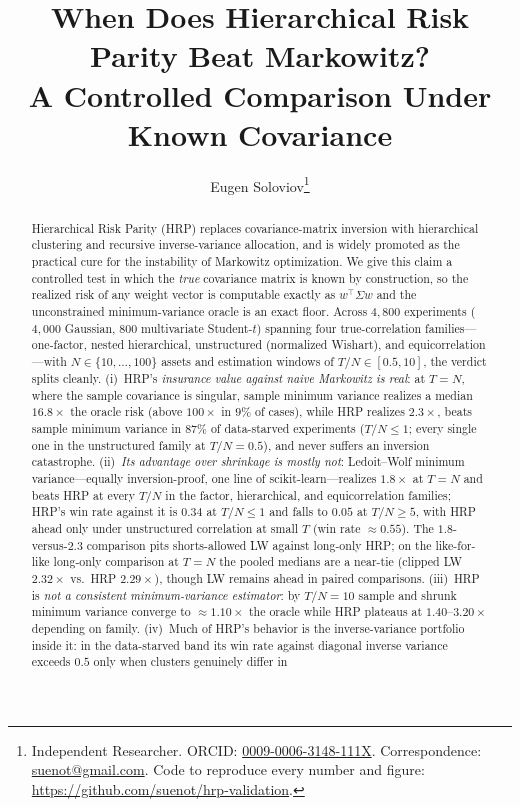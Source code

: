 \documentclass[11pt]{article}
\title{\bfseries When Does Hierarchical Risk Parity Beat Markowitz?\\
A Controlled Comparison Under Known Covariance}
\author{Eugen Soloviov\thanks{Independent Researcher. ORCID:
\href{https://orcid.org/0009-0006-3148-111X}{0009-0006-3148-111X}.
Correspondence: \href{mailto:suenot@gmail.com}{suenot@gmail.com}.
Code to reproduce every number and figure:
\url{https://github.com/suenot/hrp-validation}.}}
\date{}
\newcommand{\Sig}{\Sigma}
\newcommand{\TN}{T/N}
\begin{document}
\maketitle

\begin{abstract}
Hierarchical Risk Parity (HRP) replaces covariance-matrix inversion with
hierarchical clustering and recursive inverse-variance allocation, and is
widely promoted as the practical cure for the instability of Markowitz
optimization. We give this claim a controlled test in which the \emph{true}
covariance matrix is known by construction, so the realized risk of any weight
vector is computable exactly as $w^{\top}\Sig w$ and the unconstrained
minimum-variance oracle is an exact floor. Across $4{,}800$ experiments
($4{,}000$ Gaussian, $800$ multivariate Student-$t$) spanning four
true-correlation families---one-factor, nested hierarchical, unstructured
(normalized Wishart), and equicorrelation---with $N\in\{10,\dots,100\}$ assets
and estimation windows of $\TN\in[0.5,10]$, the verdict splits cleanly.
(i)~HRP's \emph{insurance value against naive Markowitz is real}: at $T=N$,
where the sample covariance is singular, sample minimum variance realizes a
median $16.8\times$ the oracle risk (above $100\times$ in $9\%$ of cases),
while HRP realizes $2.3\times$, beats sample minimum variance in $87\%$ of
data-starved experiments ($\TN\le1$; every single one in the unstructured
family at $\TN=0.5$), and never suffers an inversion catastrophe.
(ii)~\emph{Its advantage over shrinkage is mostly not}: Ledoit--Wolf
minimum variance---equally inversion-proof, one line of
scikit-learn---realizes $1.8\times$ at $T=N$ and beats HRP at every $\TN$ in
the factor, hierarchical, and equicorrelation families; HRP's win rate
against it is $0.34$ at $\TN\le1$ and falls to $0.05$ at $\TN\ge5$, with HRP
ahead only under unstructured correlation at small $T$ (win rate
${\approx}0.55$). The $1.8$-versus-$2.3$ comparison pits shorts-allowed LW
against long-only HRP; on the like-for-like long-only comparison at $T=N$
the pooled medians are a near-tie (clipped LW $2.32\times$ vs.\ HRP
$2.29\times$), though LW remains ahead in paired comparisons.
(iii)~HRP is \emph{not a consistent minimum-variance
estimator}: by $\TN=10$ sample and shrunk minimum variance converge to
${\approx}1.10\times$ the oracle while HRP plateaus at $1.40$--$3.20\times$
depending on family. (iv)~Much of HRP's behavior is the inverse-variance
portfolio inside it: in the data-starved band its win rate against diagonal
inverse variance exceeds $0.5$ only when clusters genuinely differ in

\end{abstract}
\end{document}
